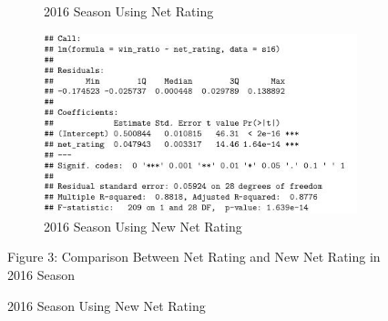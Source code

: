 \documentclass[11pt]{article}
\begin{document}
\begin{figure}[h!]
\begin{subfigure}[b]{0.42\linewidth}
    \caption{2016 Season Using Net Rating}
  \end{subfigure}
  \begin{subfigure}[b]{0.42\linewidth}
    \includegraphics[width=\linewidth]{new_nr_16_summary.jpg}
    \caption{2016 Season Using New Net Rating}
  \end{subfigure}

\bigskip

Figure 3: Comparison Between Net Rating and New Net Rating in 2016 Season
\end{figure}
\end{document}
